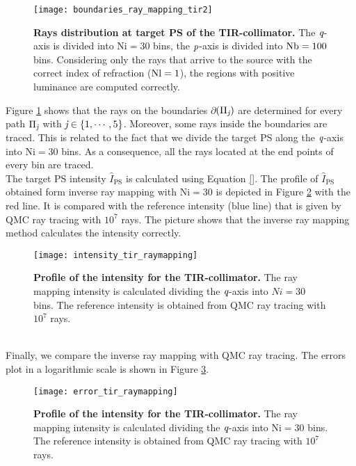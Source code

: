 \begin{figure}[h]
  \begin{center}
  \texttt{[image: boundaries\_ray\_mapping\_tir2]}
  \end{center}
  \caption{\textbf{Rays distribution at target PS of the TIR-collimator.}
 The $\textit{q}$-axis is divided into $\textrm{Ni}=30$ bins, the $\textit{p}$-axis is divided into $\textrm{Nb} = 100$ bins. Considering only the rays that arrive to the source with the correct index of refraction ($\textrm{Nl}=1$), the regions with positive luminance are computed correctly.}
\label{fig:boundaries_TIR_ray_mapping1}
 \end{figure}
Figure \ref{fig:boundaries_TIR_ray_mapping1} shows that the rays on the boundaries $\partial$$(\Pi_{\textit{j}})$ are determined for every path $\Pi_{\textit{j}}$ with $\textit{j}\in\{1, \cdots, 5\}$. Moreover, some rays inside the boundaries are traced. This is related to the fact that we divide the target PS along the $\textit{q}$-axis into $\textrm{Ni}=30$ bins. As a consequence, all the rays located at the end points of every bin are traced. \\
\indent The target PS intensity $\hat{I}_{\textrm{PS}}$ is calculated using Equation \ref{}. The profile of $\hat{I}_{\textrm{PS}}$ obtained form inverse ray mapping with $\textrm{Ni}=30$ is depicted in Figure \ref{fig:intensity_tir_raymapping} with the red line. It is compared with the reference intensity (blue line) that is given by QMC ray tracing with $10^7$ rays. The picture shows that the inverse ray mapping method calculates the intensity correctly.
\begin{figure}[t]
  \begin{center}
  \texttt{[image: intensity\_tir\_raymapping]}
  \end{center}
  \caption{\textbf{Profile of the intensity for the TIR-collimator.}
 The ray mapping intensity is calculated dividing the $\textit{q}$-axis into $\textit{Ni}=30$ bins. The reference intensity is obtained from QMC ray tracing with $10^7$ rays.}
\label{fig:intensity_tir_raymapping}
 \end{figure}
\\ \indent 
Finally, we compare the inverse ray mapping with QMC ray tracing. The errors plot in a logarithmic scale is shown in Figure \ref{fig:error_tir_raymapping}.
\begin{figure}[t]
  \begin{center}
  \texttt{[image: error\_tir\_raymapping]}
  \end{center}
  \caption{\textbf{Profile of the intensity for the TIR-collimator.}
 The ray mapping intensity is calculated dividing the $\textit{q}$-axis into $\textrm{Ni}=30$ bins. The reference intensity is obtained from QMC ray tracing with $10^7$ rays.}
\label{fig:error_tir_raymapping}
 \end{figure}
